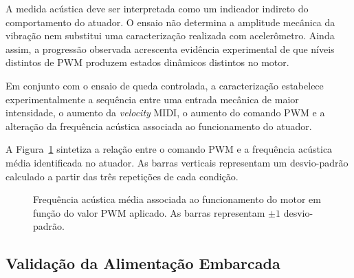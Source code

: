A medida acústica deve ser interpretada como um indicador indireto do comportamento do atuador. O ensaio não determina a amplitude mecânica da vibração nem substitui uma caracterização realizada com acelerômetro. Ainda assim, a progressão observada acrescenta evidência experimental de que níveis distintos de PWM produzem estados dinâmicos distintos no motor.

Em conjunto com o ensaio de queda controlada, a caracterização estabelece experimentalmente a sequência entre uma entrada mecânica de maior intensidade, o aumento da \textit{velocity} MIDI, o aumento do comando PWM e a alteração da frequência acústica associada ao funcionamento do atuador.

A Figura~\ref{fig:pwm_frequencia_acustica} sintetiza a relação entre o comando PWM e a frequência acústica média identificada no atuador. As barras verticais representam um desvio-padrão calculado a partir das três repetições de cada condição.

\begin{figure}[!htbp]
\centering
{}
\caption{Frequência acústica média associada ao funcionamento do motor em função do valor PWM aplicado. As barras representam $\pm 1$ desvio-padrão.}
\label{fig:pwm_frequencia_acustica}
\end{figure}




\subsection{Validação da Alimentação Embarcada}

